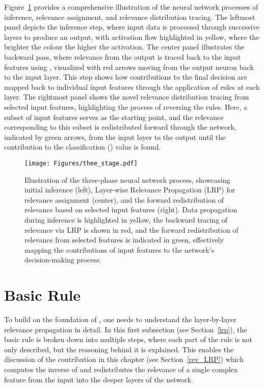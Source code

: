 Figure~\ref{Fig:thee_stage} provides a comprehensive illustration of the neural network processes of inference, relevance assignment, and relevance distribution
tracing. The leftmost panel depicts the inference step, where input data is processed through successive layers to produce an output, with activation flow highlighted in yellow, where the brighter the colour the higher the activation. The center panel illustrates the backward pass, where relevance from the output is traced back to the input features using \LRP\/, visualized with red arrows moving from the output neuron back to the input layer. This step shows how contributions to the final decision are mapped back to individual input features through the application of \LRP\/ rules at each layer. The rightmost panel shows the novel relevance distribution tracing from selected input features, highlighting the process of reversing the \LRP\/ rules. Here, a subset of input features serves as the starting point, and the relevance corresponding to this subset is redistributed forward through the network, indicated by green arrows, from the input layer to the output until the contribution to the classification (\CTC\/) value is found.

\begin{figure}[ht!]
\begin{center}
\texttt{[image: Figures/thee\_stage.pdf]}
\caption{Illustration of the three-phase neural network process, showcasing initial inference (left), Layer-wise Relevance Propagation (LRP) for relevance assignment (center), and the forward redistribution of relevance based on selected input features (right). Data propagation during inference is highlighted in yellow, the backward tracing of relevance via LRP is shown in red, and the forward redistribution of relevance from selected features is indicated in green, effectively mapping the contributions of input features to the network's decision-making process.}
\label{Fig:thee_stage}
\end{center}
\end{figure}

\section{Basic Rule}

To build on the foundation of \LRP\/, one needs to understand the layer-by-layer relevance propagation in detail. In this first subsection (see Section~\ref{lrp}), the \LRP\/ basic rule is broken down into multiple steps, where each part of the rule is not only described, but the reasoning behind it is explained. This enables the discussion of the contribution in this chapter (see Section~\ref{rev_LRP}) which computes the inverse of \LRP\/ and redistributes the relevance of a single complex feature from the input into the deeper layers of the network.


